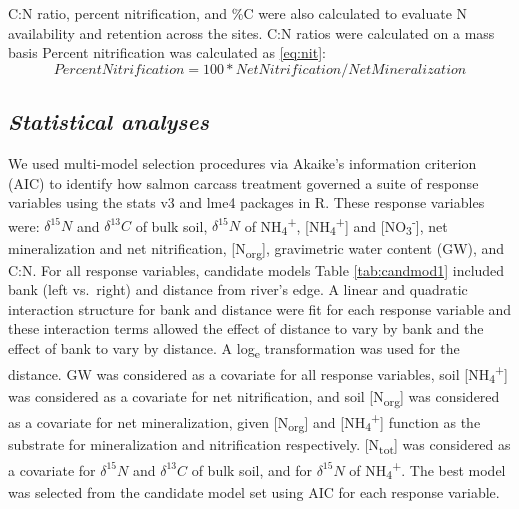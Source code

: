 \documentclass [11pt, proquest] {uwthesis}[2015/03/03]
\begin{document}
C:N ratio, percent nitrification, and \%C were also calculated to
evaluate N availability and retention across the sites. C:N ratios were
calculated on a mass basis Percent nitrification was calculated as
\eqref{eq:nit}:
\begin{equation} 
 Percent Nitrification =100 * Net Nitrification / Net Mineralization 
  \label{eq:nit}
\end{equation}
\subsection{\texorpdfstring{\emph{Statistical
analyses}}{Statistical analyses}}\label{statistical-analyses}

We used multi-model selection procedures via Akaike's information
criterion (AIC) to identify how salmon carcass treatment governed a
suite of response variables using the stats v3 and lme4 packages in R.
These response variables were: \(\delta^{15}N\) and \(\delta^{13}C\) of
bulk soil, \(\delta^{15}N\) of NH\textsubscript{4}\textsuperscript{+},
{[}NH\textsubscript{4}\textsuperscript{+}{]} and
{[}NO\textsubscript{3}\textsuperscript{-}{]}, net mineralization and net
nitrification, {[}N\textsubscript{org}{]}, gravimetric water content
(GW), and C:N. For all response variables, candidate models Table
\ref{tab:candmod1} included bank (left vs.~right) and distance from
river's edge. A linear and quadratic interaction structure for bank and
distance were fit for each response variable and these interaction terms
allowed the effect of distance to vary by bank and the effect of bank to
vary by distance. A log\textsubscript{e} transformation was used for the
distance. GW was considered as a covariate for all response variables,
soil {[}NH\textsubscript{4}\textsuperscript{+}{]} was considered as a
covariate for net nitrification, and soil {[}N\textsubscript{org}{]} was
considered as a covariate for net mineralization, given
{[}N\textsubscript{org}{]} and
{[}NH\textsubscript{4}\textsuperscript{+}{]} function as the substrate
for mineralization and nitrification respectively.
{[}N\textsubscript{tot}{]} was considered as a covariate for
\(\delta^{15}N\) and \(\delta^{13}C\) of bulk soil, and for
\(\delta^{15}N\) of NH\textsubscript{4}\textsuperscript{+}. The best
model was selected from the candidate model set using AIC for each
response variable.
\end{document}
